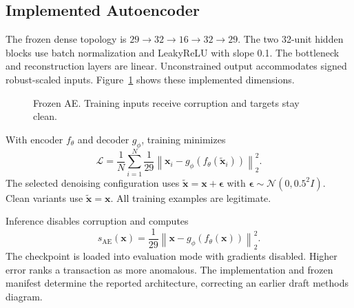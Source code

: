 \documentclass[conference]{IEEEtran}
\begin{document}
\subsection{Implemented Autoencoder}
The frozen dense topology is $29\rightarrow32\rightarrow16\rightarrow32\rightarrow29$. The two 32-unit hidden blocks use batch normalization and LeakyReLU with slope 0.1. The bottleneck and reconstruction layers are linear. Unconstrained output accommodates signed robust-scaled inputs. Figure~\ref{fig:architecture} shows these implemented dimensions.

\begin{figure}[!ht]\centering
{}
\caption{Frozen AE. Training inputs receive corruption and targets stay clean.}\label{fig:architecture}
\end{figure}

With encoder $f_\theta$ and decoder $g_\phi$, training minimizes
\begin{equation}
\mathcal{L}=\frac{1}{N}\sum_{i=1}^{N}\frac{1}{29}
\left\|\mathbf{x}_i-g_\phi(f_\theta(\widetilde{\mathbf{x}}_i))\right\|_2^2.
\end{equation}
The selected denoising configuration uses
$\widetilde{\mathbf{x}}=\mathbf{x}+\boldsymbol{\epsilon}$ with
$\boldsymbol{\epsilon}\sim\mathcal{N}(0,0.5^2 I)$. Clean variants use $\widetilde{\mathbf{x}}=\mathbf{x}$. All training examples are legitimate.

Inference disables corruption and computes
\begin{equation}
s_{\mathrm{AE}}(\mathbf{x})=\frac{1}{29}
\left\|\mathbf{x}-g_\phi(f_\theta(\mathbf{x}))\right\|_2^2.
\end{equation}
The checkpoint is loaded into evaluation mode with gradients disabled. Higher error ranks a transaction as more anomalous. The implementation and frozen manifest determine the reported architecture, correcting an earlier draft methods diagram.
\end{document}
